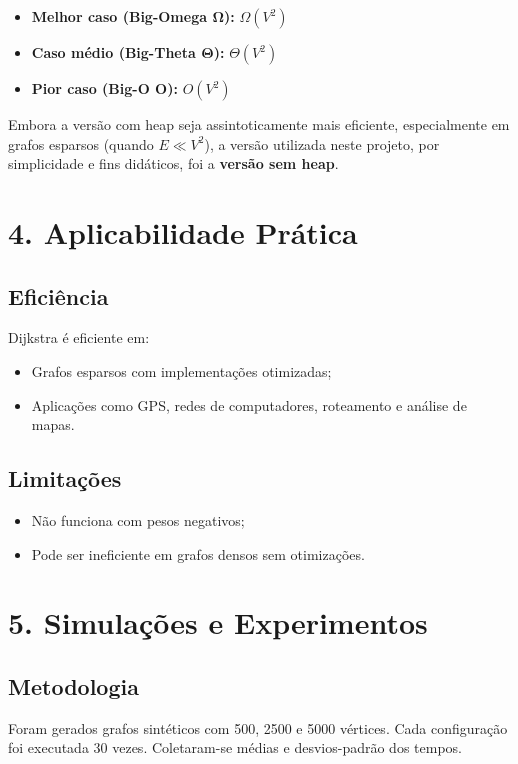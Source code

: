 \documentclass[12pt,a4paper]{report}
\begin{document}
\begin{itemize}
\item \textbf{Melhor caso (Big-Omega $\boldsymbol{\Omega}$):} $\Omega(V^2)$
\item \textbf{Caso médio (Big-Theta $\boldsymbol{\Theta}$):} $\Theta(V^2)$
\item \textbf{Pior caso (Big-O $\boldsymbol{O}$):} $O(V^2)$
\end{itemize}

Embora a versão com heap seja assintoticamente mais eficiente, especialmente em grafos esparsos (quando $E \ll V^2$), a versão utilizada neste projeto, por simplicidade e fins didáticos, foi a \textbf{versão sem heap}.

\chapter{4. Aplicabilidade Prática}

\section*{Eficiência}
Dijkstra é eficiente em:
\begin{itemize}
    \item Grafos esparsos com implementações otimizadas;
    \item Aplicações como GPS, redes de computadores, roteamento e análise de mapas.
\end{itemize}

\section*{Limitações}
\begin{itemize}
    \item Não funciona com pesos negativos;
    \item Pode ser ineficiente em grafos densos sem otimizações.
\end{itemize}

\chapter{5. Simulações e Experimentos}

\section*{Metodologia}
Foram gerados grafos sintéticos com 500, 2500 e 5000 vértices. Cada configuração foi executada 30 vezes. Coletaram-se médias e desvios-padrão dos tempos.
\end{document}

